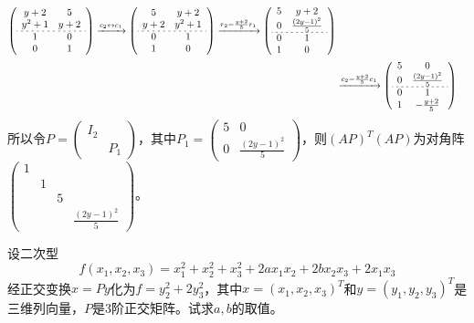 \documentclass[a4paper]{report}
\begin{document}
\begin{jie}
\begin{align*}
{\left(
 \begin{array}{ccc}
y+2&5\\
y^2+1&y+2\\
\hdashline[2pt/3pt]
1 &0 \\
0 &1
\end{array}
\right)
}\xrightarrow{\substack{ c_2\leftrightarrow c_1}}{
\left(
 \begin{array}{ccc}
5&y+2\\
y+2&y^2+1\\
\hdashline[2pt/3pt]
0 &1\\
1 &0
\end{array}
\right)
}\xrightarrow{\substack{r_2-\frac{y+2}{5}r_1}}{
\left(
 \begin{array}{ccc}
5&y+2\\
0&\frac{(2y-1)^2}{5}\\
\hdashline[2pt/3pt]
0 &1\\
1 &0
\end{array}
\right)
}\\
&\xrightarrow{\substack{c_2-\frac{y+2}{5}c_1}}{
\left(
 \begin{array}{ccc}
5&0\\
0&\frac{(2y-1)^2}{5}\\
\hdashline[2pt/3pt]
0 &1\\
1 &-\frac{y+2}{5}
\end{array}
\right)
}
\end{align*}
所以令$
P=
\begin{pmatrix}
I_2\\
&P_1
\end{pmatrix}
$，其中$P_1=
\begin{pmatrix}
5&0\\
0&\frac{(2y-1)^2}{5}
\end{pmatrix}
$，则$(AP)^T(AP)$为对角阵$
\begin{pmatrix}
1\\&1\\&&5\\&&&\frac{(2y-1)^2}{5}
\end{pmatrix}$。
\end{jie}

\EX 设二次型
\begin{equation*}
f(x_1,x_2,x_3)=x_1^2+x_2^2+x_3^2+2ax_1x_2+2bx_2x_3+2x_1x_3
\end{equation*}
经正交变换$x=Py$化为$f=y_2^2+2y_3^2$，其中$x=(x_1,x_2,x_3)^T$和$y=(y_1,y_2,y_3)^T$是三维列向量，$P$是3阶正交矩阵。试求$a,b$的取值。
\end{document}
